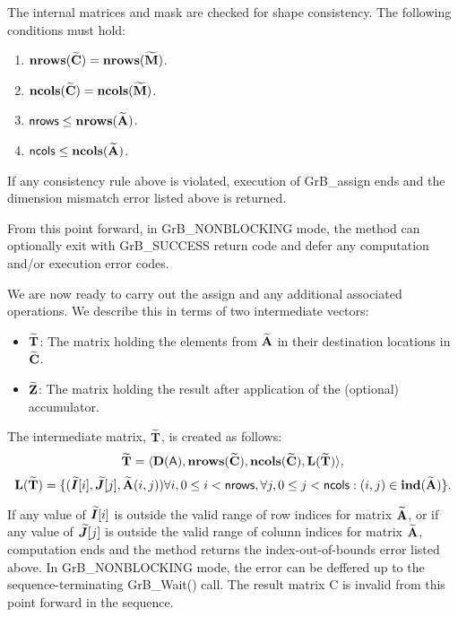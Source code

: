 The internal matrices and mask are checked for shape consistency. The following 
conditions must hold:
\begin{enumerate}
    \item $\bold{nrows}({\bf \widetilde{C}}) = \bold{nrows}({\bf \widetilde{M}})$.
    \item $\bold{ncols}({\bf \widetilde{C}}) = \bold{ncols}({\bf \widetilde{M}})$.
    \item ${\sf nrows} \leq \bold{nrows}({\bf \widetilde{A}})$.
    \item ${\sf ncols} \leq \bold{ncols}({\bf \widetilde{A}})$.
\end{enumerate}
If any consistency rule above is violated, execution of {\sf GrB\_assign} ends and 
the dimension mismatch error listed above is returned.

From this point forward, in {\sf GrB\_NONBLOCKING} mode, the method can optionally exit
with {\sf GrB\_SUCCESS} return code and defer any computation and/or execution error
codes.

We are now ready to carry out the assign and any additional 
associated operations.  We describe this in terms of two intermediate vectors:
\begin{itemize}
	\item ${\bf \widetilde{T}}$: The matrix holding the elements from
		${\bf \widetilde{A}}$ in their destination locations in ${\bf \widetilde{C}}$.
	\item ${\bf \widetilde{Z}}$: The matrix holding the result after 
    application of the (optional) accumulator.
\end{itemize}

The intermediate matrix, ${\bf \widetilde{T}}$, is created as follows:
\[ {\bf \widetilde{T}} = \langle
\bold{D}({\sf A}), \bold{nrows}({\bf \widetilde{C}}), \bold{ncols}({\bf \widetilde{C}}),
\bold{L}({\bf \widetilde{T}}) \rangle, \]
\[
	\bold{L}({\bf \widetilde{T}}) =
\{(\bm{\widetilde{I}}[i],\bm{\widetilde{J}}[j],{\bf \widetilde{A}}(i,j)) \forall i, 0 \leq i < {\sf nrows}, \forall j, 0 \leq j < {\sf ncols} : 
(i,j) \in \bold{ind}({\bf \widetilde{A}}) \}. \]

If any value of $\bm{\widetilde{I}}[i]$ is outside the valid range of row indices
for matrix ${\bf \widetilde{A}}$, or if any value of $\bm{\widetilde{J}}[j]$ is outside the valid range of column indices for matrix ${\bf \widetilde{A}}$,
computation ends and the method returns the
index-out-of-bounds error listed above. In {\sf GrB\_NONBLOCKING} mode, the error
can be deffered up to the sequence-terminating {\sf GrB\_Wait()} call.
The result matrix {\sf C} is invalid from this point forward in
the sequence.

